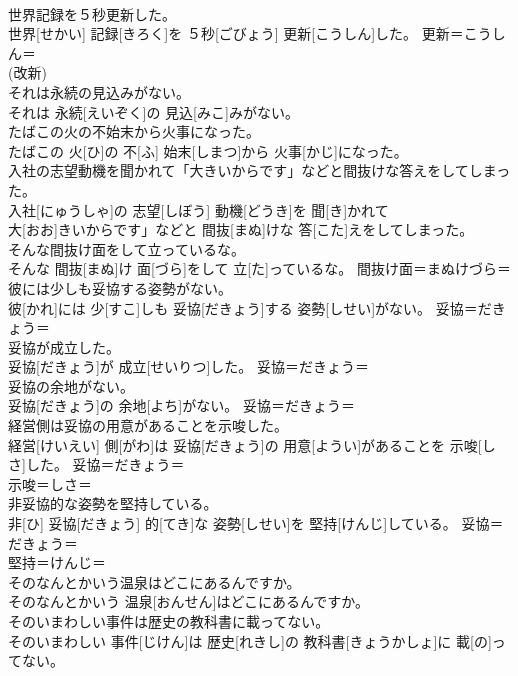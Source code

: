 \documentclass[8pt]{extreport}
\begin{document}
\begin{CJK}{UTF8}{min}
{\\	世界記録を５秒更新した。	
\\	世界[せかい] 記録[きろく]を ５秒[ごびょう] 更新[こうしん]した。	更新＝こうしん＝ 
\\	(改新) 
\\	それは永続の見込みがない。	
\\	それは 永続[えいぞく]の 見込[みこ]みがない。	
\\	たばこの火の不始末から火事になった。	
\\	たばこの 火[ひ]の 不[ふ] 始末[しまつ]から 火事[かじ]になった。	
\\	入社の志望動機を聞かれて「大きいからです」などと間抜けな答えをしてしまった。	
\\	入社[にゅうしゃ]の 志望[しぼう] 動機[どうき]を 聞[き]かれて
\\	大[おお]きいからです」などと 間抜[まぬ]けな 答[こた]えをしてしまった。	
\\	そんな間抜け面をして立っているな。	
\\	そんな 間抜[まぬ]け 面[づら]をして 立[た]っているな。	間抜け面＝まぬけづら＝ 
\\	彼には少しも妥協する姿勢がない。	
\\	彼[かれ]には 少[すこ]しも 妥協[だきょう]する 姿勢[しせい]がない。	妥協＝だきょう＝ 
\\	妥協が成立した。	
\\	妥協[だきょう]が 成立[せいりつ]した。	妥協＝だきょう＝ 
\\	妥協の余地がない。	
\\	妥協[だきょう]の 余地[よち]がない。	妥協＝だきょう＝ 
\\	経営側は妥協の用意があることを示唆した。	
\\	経営[けいえい] 側[がわ]は 妥協[だきょう]の 用意[ようい]があることを 示唆[しさ]した。	妥協＝だきょう＝ 
\\	示唆＝しさ＝ 
\\	非妥協的な姿勢を堅持している。	
\\	非[ひ] 妥協[だきょう] 的[てき]な 姿勢[しせい]を 堅持[けんじ]している。	妥協＝だきょう＝ 
\\	堅持＝けんじ＝ 
\\	そのなんとかいう温泉はどこにあるんですか。	
\\	そのなんとかいう 温泉[おんせん]はどこにあるんですか。	
\\	そのいまわしい事件は歴史の教科書に載ってない。	
\\	そのいまわしい 事件[じけん]は 歴史[れきし]の 教科書[きょうかしょ]に 載[の]ってない。	
}
\end{CJK}
\end{document}
